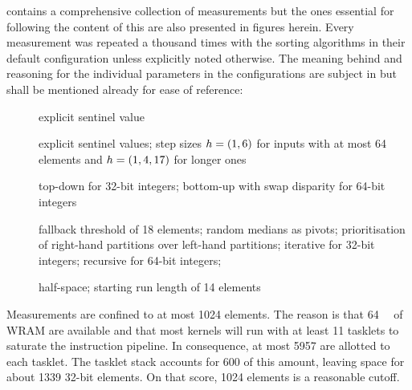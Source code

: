  contains a comprehensive collection of measurements but the ones essential for following the content of this  are also presented in figures herein.
Every measurement was repeated a thousand times with the sorting algorithms in their default configuration unless explicitly noted otherwise.
The meaning behind and reasoning for the individual parameters in the configurations are subject in  but shall be mentioned already for ease of reference:
\begin{description}
	\item[\IS{}]
	explicit sentinel value

	\item[\ShS{}]
	explicit sentinel values;
	step sizes \(h = \lparen1, 6\rparen\) for inputs with at most 64 elements and \(h = \lparen1, 4, 17\rparen\) for longer ones

	\item[\HS{}]
	top-down for 32-bit integers;
	bottom-up with swap disparity for 64-bit integers

	\item[\QS{}]
	fallback threshold of 18 elements;
	random medians as pivots;
	prioritisation of right-hand partitions over left-hand partitions;
	iterative for 32-bit integers;
	recursive for 64-bit integers;

	\item[\MS{}]
	half-space;
	starting run length of 14 elements
\end{description}

Measurements are confined to at most \num{1024} elements.
The reason is that \qty{64}{\kibi\byte} of \ac{WRAM} are available and that most kernels will run with at least 11 tasklets to saturate the instruction pipeline.
In consequence, at most \qty{5957}{\byte} are allotted to each tasklet.
The tasklet stack accounts for \qty{600}{\byte} of this amount, leaving space for about \num{1339} 32-bit elements.
On that score, 1024 elements is a reasonable cutoff.












